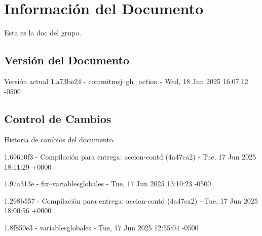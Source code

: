 \documentclass[
	a4paper, %
	12pt, %
]{include/CSSullivanBusinessReport}
\begin{document}
\newpage

\begin{twothirdswidth} %
	\tableofcontents %
\end{twothirdswidth}

\newpage


\newpage

\section{Información del
Documento}\label{sec:informaciuxf3n-del-documento}

Esta es la doc del grupo.

\subsection{Versión del Documento}\label{sec:versiuxf3n-del-documento}

\begin{quote}
\end{quote}

Versión actual 1.a73be24 - commitmsj--gh\_action - Wed, 18 Jun 2025
16:07:12 -0500

\subsection{Control de Cambios}\label{sec:control-de-cambios}

Historia de cambios del documento.

1.69610f3 - Compilación para entrega: accion-contd (4a47ca2) - Tue, 17
Jun 2025 18:11:29 +0000

1.97a313e - fix--variablesglobales - Tue, 17 Jun 2025 13:10:23 -0500

1.298b557 - Compilación para entrega: accion-contd (4a47ca2) - Tue, 17
Jun 2025 18:00:56 +0000

1.8f850e3 - variablesglobales - Tue, 17 Jun 2025 12:55:04 -0500
\end{document}
